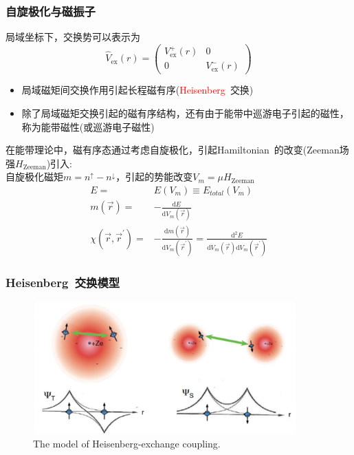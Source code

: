 \documentclass[cjk,slidestop,compress,mathserif,blue]{beamer}
\begin{document}
\frame
{
	\frametitle{自旋极化与磁振子}
			局域坐标下，交换势可以表示为
			\begin{displaymath}
				\hat{V}_{\mathrm{ex}}(r)=\left(
				\begin{matrix}
					V_{\mathrm{ex}}^+(r) &0\\
					0 &V_{\mathrm{ex}}^-(r)
				\end{matrix}\right)
			\end{displaymath}
	\begin{itemize}
		\item 局域磁矩间交换作用引起长程磁有序(\textcolor{red}{\textrm{Heisenberg~}}交换)
		\item 除了局域磁矩交换引起的磁有序结构，还有由于能带中巡游电子引起的磁性，称为能带磁性(或巡游电子磁性)
	\end{itemize}
	在能带理论中，磁有序态通过考虑自旋极化，引起\textrm{Hamiltonian~}的改变(\textrm{Zeeman}场强$H_{\mathrm{Zeeman}}$)引入:\\
	自旋极化磁矩$m=n^{\uparrow}-n^{\downarrow}$，引起的势能改变$V_m=\mu H_{\mathrm{Zeeman}}$
	\begin{displaymath}
		\begin{aligned}
			E=&E(V_m)\equiv E_{total}(V_m)\\
			m(\vec r)=&-\frac{\mathrm{d}E}{\mathrm{d}V_m(\vec r)}\\
			\chi(\vec r,\vec r^{\prime})=&-\frac{\mathrm{d}m(\vec r)}{\mathrm{d}V_m(\vec r^{\prime})}=\frac{\mathrm{d}^2E}{\mathrm{d}V_m(\vec r)\mathrm{d}V_m(\vec r^{\prime})}
		\end{aligned}
	\end{displaymath}
}

\frame
{
	\frametitle{\textrm{Heisenberg~}交换模型}
\begin{figure}[h!]
\centering
\includegraphics[height=2.0in,width=4.0in,viewport=0 0 580 290,clip]{Figures/Heisenberg_model.jpg}
\caption{\tiny \textrm{The model of Heisenberg-exchange coupling.}}%
\label{Heisenberg_Model}
\end{figure} 
}
\end{document}
